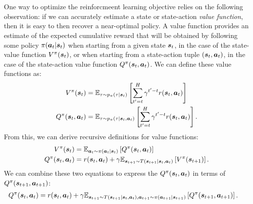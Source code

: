 \documentclass[../thesis.tex]{subfiles}
\begin{document}
~


~

One way to optimize the reinforcmeent learning objective relies on the following observation: if we can accurately estimate a state or state-action \emph{value function}, then it is easy to then recover a near-optimal policy. A value function provides an estimate of the expected cumulative reward that will be obtained by following some policy $\pi(\boldsymbol{a}_t|\boldsymbol{s}_t)$ when starting from a given state $\boldsymbol{s}_t$, in the case of the state-value function $V^\pi(\boldsymbol{s}_t)$, or when starting from a state-action tuple $(\boldsymbol{s}_t,\boldsymbol{a}_t)$, in the case of the state-action value function $Q^\pi(\boldsymbol{s}_t,\boldsymbol{a}_t)$. We can define these value functions as:
\begin{align*}
V^\pi(\boldsymbol{s}_t) &= \mathbb{E}_{\tau \sim p_\pi(\tau | \boldsymbol{s}_t)} \left[
\sum_{t' = t}^H \gamma^{t' - t} r(\boldsymbol{s}_t, \boldsymbol{a}_t)
\right] \\
Q^\pi(\boldsymbol{s}_t,\boldsymbol{a}_t) &= \mathbb{E}_{\tau \sim p_\pi(\tau | \boldsymbol{s}_t, \boldsymbol{a}_t)} \left[
\sum_{t' = t}^H \gamma^{t' - t} r(\boldsymbol{s}_t, \boldsymbol{a}_t)
\right].
\end{align*}
From this, we can derive recursive definitions for value functions:
\begin{align*}
V^\pi(\boldsymbol{s}_t) &= \mathbb{E}_{\boldsymbol{a}_t \sim \pi(\boldsymbol{a}_t | \boldsymbol{s}_t)}\left[
Q^\pi(\boldsymbol{s}_t,\boldsymbol{a}_t)
\right] \\
Q^\pi(\boldsymbol{s}_t, \boldsymbol{a}_t) &= r(\boldsymbol{s}_t,\boldsymbol{a}_t) + \gamma \mathbb{E}_{\boldsymbol{s}_{t+1} \sim T(\boldsymbol{s}_{t+1}|\boldsymbol{s}_t,\boldsymbol{a}_t)}\left[
V^\pi(\boldsymbol{s}_{t+1})
\right].
\end{align*}
We can combine these two equations to express the $Q^\pi(\boldsymbol{s}_t,\boldsymbol{a}_t)$ in terms of $Q^\pi(\boldsymbol{s}_{t+1},\boldsymbol{a}_{t+1})$:
\begin{align}
Q^\pi(\boldsymbol{s}_t, \boldsymbol{a}_t) &= r(\boldsymbol{s}_t,\boldsymbol{a}_t) + \gamma \mathbb{E}_{\boldsymbol{s}_{t+1} \sim T(\boldsymbol{s}_{t+1}|\boldsymbol{s}_t,\boldsymbol{a}_t), \boldsymbol{a}_{t+1} \sim \pi(\boldsymbol{a}_{t+1} | \boldsymbol{s}_{t+1})}\left[
Q^\pi(\boldsymbol{s}_{t+1},\boldsymbol{a}_{t+1})
\right]. \label{eq:qeq}
\end{align}
\end{document}
